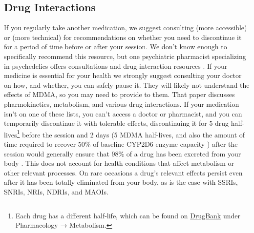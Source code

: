 \documentclass[12pt,letterpaper]{book}
\begin{document}
\subsection*{Drug Interactions}
If you regularly take another medication, we suggest consulting \textcite{liechtiInteractions} (more accessible) or \textcite{sarparastDrugInteractions} (more technical) for recommendations on whether you need to discontinue it for a period of time before or after your session. We don't know enough to specifically recommend this resource, but one psychiatric pharmacist specializing in psychedelics offers consultations and drug-interaction resources \cite{spiritPharmacist}. If your medicine is essential for your health we strongly suggest consulting your doctor on how, and whether, you can safely pause it. They will likely not understand the effects of MDMA, so you may need to provide \textcite{sarparastDrugInteractions} to them. That paper discusses pharmokinetics, metabolism, and various drug interactions. If your medication isn't on one of these lists, you can't access a doctor or pharmacist, and you can temporarily discontinue it with tolerable effects, discontinuing it for 5 drug half-lives\footnote{Each drug has a different half-life, which can be found on \href{https://go.drugbank.com}{DrugBank} under Pharmacology → Metabolism.} before the session and 2 days (5 MDMA half-lives, and also the amount of time required to recover 50\% of baseline CYP2D6 enzyme capacity \cite{omathunaCYP}) after the session would generally ensure that 98\% of a drug has been excreted from your body \cite{andradeHalf,torrePharmacology}. This does not account for health conditions that affect metabolism or other relevant processes. On rare occasions a drug's relevant effects persist even after it has been totally eliminated from your body, as is the case with SSRIs, SNRIs, NRIs, NDRIs, and MAOIs.
\end{document}
